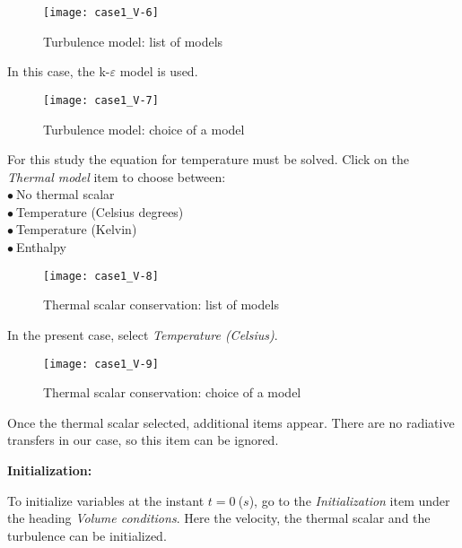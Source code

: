 \begin{figure}[ht]
\begin{center}
\texttt{[image: case1\_V-6]}
\caption{Turbulence model: list of models}
\label{fig9_e1}
\end{center}
\end{figure}


\clearpage
In this case, the k-$\varepsilon$ model is used.

\begin{figure}[ht]
\begin{center}
\texttt{[image: case1\_V-7]}
\caption{Turbulence model: choice of a model}
\label{fig10_e1}
\end{center}
\end{figure}


\clearpage
For this study the equation for temperature must be solved. Click on the
{\itshape Thermal model} item to
choose between:\\
\hspace*{1cm}$\bullet\ $No thermal scalar\\
\hspace*{1cm}$\bullet\ $Temperature (Celsius degrees)\\
\hspace*{1cm}$\bullet\ $Temperature (Kelvin)\\
\hspace*{1cm}$\bullet\ $Enthalpy

\begin{figure}[ht]
\begin{center}
\texttt{[image: case1\_V-8]}
\caption{Thermal scalar conservation: list of models}
\label{fig11_e1}
\end{center}
\end{figure}


\clearpage
In the present case, select {\itshape Temperature (Celsius)}.
\begin{figure}[ht]
\begin{center}
\texttt{[image: case1\_V-9]}
\caption{Thermal scalar conservation: choice of a model}
\label{fig12_e1}
\end{center}
\end{figure}

Once the thermal scalar selected, additional items appear.
There are no radiative transfers in our case, so this item can be ignored.

\clearpage
\textbf{Initialization:}

To initialize variables at the instant $t=0\ $($s$), go to the {\itshape Initialization} item
under the heading {\itshape Volume conditions}. Here the velocity, the thermal scalar and
the turbulence can be initialized.

